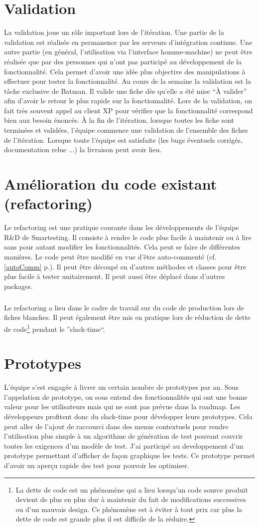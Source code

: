 \section{Validation}
La validation joue un rôle important lors de l'itération. Une partie de la validation est réalisée en permanence par les serveurs d'intégration continue. Une autre partie (en général, l'utilisation via l'interface homme-machine) ne peut être réalisée que par des personnes qui n'ont pas participé au développement de la fonctionnalité. Cela permet d'avoir une idée plus objective des manipulations à effectuer pour tester la fonctionnalité. Au cours de la semaine la validation est la tâche exclusive de Batman. Il valide une fiche dès qu'elle a été mise ``À valider'' afin d'avoir le retour le plus rapide sur la fonctionnalité. Lors de la validation, on fait très souvent appel au client XP pour vérifier que la fonctionnalité correspond bien aux besoin énoncés. À la fin de l'itération, lorsque toutes les fiche sont terminées et validées, l'équipe commence une validation de l'ensemble des fiches de l'itération. Lorsque toute l'équipe est satisfaite (les bugs éventuels corrigés, documentation relue ...) la livraison peut avoir lieu.
\section{Amélioration du code existant (refactoring)}
Le refactoring est une pratique courante dans les développements de l'équipe R\&D de Smartesting. Il consiste à rendre le code plus facile à maintenir ou à lire sans pour autant modifier les fonctionnalités. Cela peut se faire de différentes manières. Le code peut être modifié en vue d'être auto-commenté (cf. \ref{autoComm} p.\pageref{autoComm}). Il peut être découpé en d'autres méthodes et classes pour être plus facile à tester unitairement. Il peut aussi être déplacé dans d'autres packages.
\subparagraph*{}
Le refactoring a lieu dans le cadre de travail sur du code de production lors de fiches blanches. Il peut également être mis en pratique lors de réduction de dette de code\footnote{La dette de code est un phénomène qui a lieu lorsqu'un code source produit devient de plus en plus dur à maintenir du fait de modifications successives ou d'un mauvais design. Ce phénomène est à éviter à tout prix car plus la dette de code est grande plus il est difficile de la réduire.} pendant le ''slack-time``.
\section{Prototypes}
L'équipe s'est engagée à livrer un certain nombre de prototypes par an. Sous l'appelation de prototype, on sous entend des fonctionnalités qui ont une bonne valeur pour les utilisateurs mais qui ne sont pas prévue dans la roadmap. Les développeurs profitent donc du slack-time pour développer leurs prototypes. Cela peut aller de l'ajout de raccourci dans des menus contextuels pour rendre l'utilisation plus simple à un algorithme de génération de test pouvant couvrir toutes les exigences d'un modèle de test. J'ai participé au developpement d'un prototype permettant d'afficher de façon graphique les tests. Ce prototype permet d'avoir un aperçu rapide des test pour pouvoir les optimiser.
